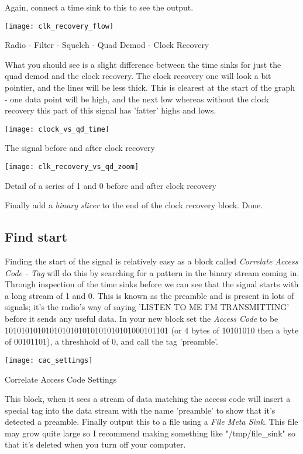 Again, connect a time sink to this to see the output.


\centrefigurestart
\texttt{[image: clk\_recovery\_flow]}
\caption{Radio - Filter - Squelch - Quad Demod - Clock Recovery}
\centrefigureend

What you should see is a slight difference between the time sinks for just the quad demod and the clock recovery. The clock recovery one will look a bit pointier, and the lines will be less thick. This is clearest at the start of the graph - one data point will be high, and the next low whereas without the clock recovery this part of this signal has 'fatter' highs and lows.

\centrefigurestart
\texttt{[image: clock\_vs\_qd\_time]}
\caption{The signal before and after clock recovery}
\centrefigureend

\centrefigurestart
\texttt{[image: clk\_recovery\_vs\_qd\_zoom]}
\caption{Detail of a series of 1 and 0 before and after clock recovery}
\centrefigureend

Finally add a \textit{binary slicer} to the end of the clock recovery block. Done.
\subsection{Find start}
Finding the start of the signal is relatively easy as a block called \textit{Correlate Access Code - Tag} will do this by searching for a pattern in the binary stream coming in. Through inspection of the time sinks before we can see that the signal starts with a long stream of 1 and 0. This is known as the preamble and is present in lots of signals; it's the radio's way of saying 'LISTEN TO ME I'M TRANSMITTING' before it sends any useful data. In your new block set the \textit{Access Code} to be 1010101010101010101010101010101000101101 (or 4 bytes of 10101010 then a byte of 00101101), a threshhold of 0, and call the tag 'preamble'. 

\centrefigurestart
\texttt{[image: cac\_settings]}
\caption{Correlate Access Code Settings}
\centrefigureend

This block, when it sees a stream of data matching the access code will insert a special tag into the data stream with the name 'preamble' to show that it's detected a preamble. Finally output this to a file using a \textit{File Meta Sink}. This file may grow quite large so I recommend making something like "/tmp/file\_sink" so that it's deleted when you turn off your computer.

